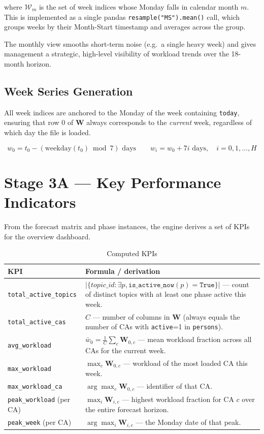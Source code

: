 \documentclass[12pt,a4paper]{report}
\begin{document}
where $\mathcal{W}_m$ is the set of week indices whose Monday falls
in calendar month $m$. This is implemented as a single pandas
\texttt{resample("MS").mean()} call, which groups weeks by their
Month-Start timestamp and averages across the group.

The monthly view smooths short-term noise (e.g.\ a single heavy week)
and gives management a strategic, high-level visibility of workload
trends over the 18-month horizon.

\subsection{Week Series Generation}

All week indices are anchored to the Monday of the week containing
\texttt{today}, ensuring that row 0 of $\mathbf{W}$ always corresponds
to the \textit{current} week, regardless of which day the file is loaded.

\[
  w_0 = t_0 - (\text{weekday}(t_0) \bmod 7) \text{ days}
  \qquad
  w_i = w_0 + 7i \text{ days},\quad i = 0, 1, \ldots, H
\]

\section{Stage 3A --- Key Performance Indicators}
\label{sec:kpis}

From the forecast matrix and phase instances, the engine derives a set
of KPIs for the overview dashboard.

\begin{table}[H]
\centering
\caption{Computed KPIs}
\begin{tabularx}{\linewidth}{@{} l X @{}}
\toprule
\textbf{KPI} & \textbf{Formula / derivation} \\
\midrule
\texttt{total\_active\_topics} &
  $|\{topic\_id : \exists p, \texttt{is\_active\_now}(p) = \texttt{True}\}|$
  --- count of distinct topics with at least one phase active this week. \\[6pt]
\texttt{total\_active\_cas} &
  $C$ --- number of columns in $\mathbf{W}$ (always equals the number
  of CAs with \texttt{active}=1 in \texttt{persons}). \\[6pt]
\texttt{avg\_workload} &
  $\bar{w}_0 = \frac{1}{C} \sum_c \mathbf{W}_{0,c}$
  --- mean workload fraction across all CAs for the current week. \\[6pt]
\texttt{max\_workload} &
  $\max_c \mathbf{W}_{0,c}$ --- workload of the most loaded CA
  this week. \\[6pt]
\texttt{max\_workload\_ca} &
  $\arg\max_c \mathbf{W}_{0,c}$ --- identifier of that CA. \\[6pt]
\texttt{peak\_workload} (per CA) &
  $\max_i \mathbf{W}_{i,c}$ --- highest workload fraction for CA $c$
  over the entire forecast horizon. \\[6pt]
\texttt{peak\_week} (per CA) &
  $\arg\max_i \mathbf{W}_{i,c}$ --- the Monday date of that peak. \\
\bottomrule
\end{tabularx}
\end{table}
\end{document}
